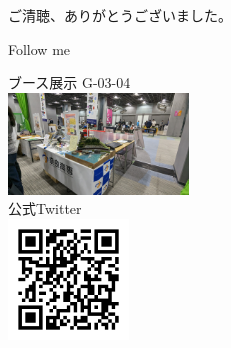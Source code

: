 \documentclass[dvipdfmx]{beamer}
\begin{document}
\begin{frame}
  \begin{center}
    \begin{Large}
      ご清聴、ありがとうございました。
    \end{Large}
  \end{center}

  \begin{alertblock}{Follow me}
    \begin{center}
      ブース展示 G-03-04\\
      \includegraphics[width=0.36\textwidth]{pic/Booth.jpg}\\
      公式Twitter\\
      \includegraphics[width=0.24\textwidth]{pic/Twitter.png}
    \end{center}
  \end{alertblock}
\end{frame}
\end{document}
